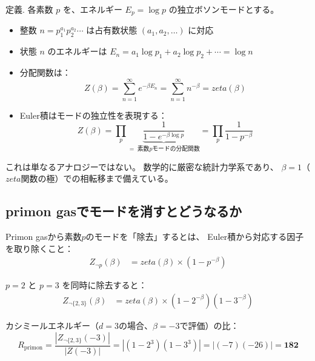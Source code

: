 \documentclass[11pt,a4paper]{article}
\def\zeta{zeta}%
\def\textbf#1{#1}%
\begin{document}
\begin{tcolorbox}[colback=green!5,colframe=green!60!black,title=Primon Gas（素数ガス）]
\textbf{定義.} 各素数 $p$ を、エネルギー $E_p = \log p$ の独立ボソンモードとする。

\begin{itemize}
\item 整数 $n = p_1^{a_1} p_2^{a_2} \cdots$ は占有数状態 $(a_1, a_2, \ldots)$ に対応
\item 状態 $n$ のエネルギーは $E_n = a_1 \log p_1 + a_2 \log p_2 + \cdots = \log n$
\item 分配関数は：
\begin{equation}
  Z(\beta) = \sum_{n=1}^{\infty} e^{-\beta E_n}
  = \sum_{n=1}^{\infty} n^{-\beta}
  = \zeta(\beta)
\end{equation}
\item Euler積は\textbf{モードの独立性}を表現する：
\begin{equation}
  Z(\beta) = \prod_{p} \underbrace{\frac{1}{1 - e^{-\beta \log p}}}_{=\;\text{素数$p$モードの分配関数}}
  = \prod_{p} \frac{1}{1 - p^{-\beta}}
\end{equation}
\end{itemize}
\end{tcolorbox}

これは単なるアナロジーではない。
数学的に厳密な統計力学系であり、
$\beta = 1$（$\zeta$関数の極）での相転移まで備えている。

\subsection{primon gasでモードを消すとどうなるか}

Primon gasから素数$p$のモードを「除去」するとは、
Euler積から対応する因子を取り除くこと：
\begin{align}
  Z_{\neg p}(\beta) &= \zeta(\beta) \times (1 - p^{-\beta})
  \label{eq:mute-one}
\end{align}

$p = 2$ と $p = 3$ を同時に除去すると：
\begin{align}
  Z_{\neg\{2,3\}}(\beta) &= \zeta(\beta) \times (1 - 2^{-\beta})(1 - 3^{-\beta})
  \label{eq:mute-two}
\end{align}

カシミールエネルギー（$d=3$の場合、$\beta = -3$で評価）の比：
\begin{equation}
  R_{\text{primon}} = \frac{|Z_{\neg\{2,3\}}(-3)|}{|Z(-3)|}
  = |(1 - 2^3)(1 - 3^3)| = |(-7)(-26)| = \mathbf{182}
  \label{eq:R-primon}
\end{equation}
\end{document}
